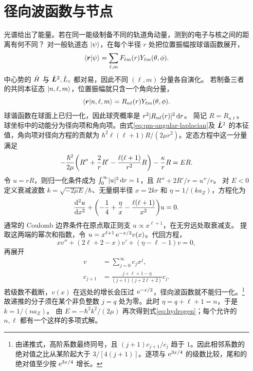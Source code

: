 \section{径向波函数与节点}
\label{sec:hydrogen-radial}
光谱给出了能量。若在同一能级制备不同的轨道角动量，测到的电子与核之间的距离有何不同？
对一般轨道态 $\ket\psi$，在每个半径 $r$ 处把位置振幅按球谐函数展开，
\begin{equation}\label{eq:qm-orbital-angular-expansion}
    \braket{\bm r}{\psi} = \sum_{\ell,m} F_{\ell m}(r)Y_{\ell m}(\theta,\phi).
\end{equation}
中心势的 $\op H$ 与 $\opbm L^2,\op L_z$ 都对易，因此不同 $(\ell,m)$ 分量各自演化。
若制备三者的共同本征态 $\ket{n,\ell,m}$，位置振幅就只含一个角向分量，
\begin{equation}\label{eq:qm-hydrogen-position-amplitude}
    \braket{\bm r}{n,\ell,m} = R_{n\ell}(r)Y_{\ell m}(\theta,\phi).
\end{equation}
球谐函数在球面上已归一化，因此球壳概率是 $r^2\abs{R_{n\ell}(r)}^2\d r$。
简记 $R = R_{n\ell}$。球坐标中的动能分为径向项和角向项。由式\eqref{eq:qm-angular-laplacian}及 $\opbm L^2$ 的本征值，角向项对径向方程的贡献为 $\hbar^2\ell(\ell + 1)R/(2\mu r^2)$。定态方程中这一分量满足
\begin{equation}
    -\frac{\hbar^2}{2\mu}
       \biggp{R'' + \frac{2}{r}R' - \frac{\ell(\ell + 1)}{r^2}R}
       - \frac{\kappa}{r}R = E R.
    \label{eq:hydrogen-radial}
\end{equation}
令 $u = rR$，则归一化条件成为 $\textstyle \intRplus\abs u^2\d r = 1$，且 $R'' + 2R'/r = u''/r$。
对 $E < 0$ 定义衰减波数 $k = \sqrt{-2\mu E}/\hbar$、无量纲半径 $x = 2kr$ 和 $\eta = 1/(ka_Z)$，方程化为
\begin{equation}
    \dv[2]{u}{x} + \biggp{-\frac14 + \frac{\eta}{x} - \frac{\ell(\ell + 1)}{x^2}}u = 0 .
\end{equation}
通常的 Coulomb 边界条件在原点取正则支 $u \propto x^{\ell+1}$，在无穷远处取衰减支。
提取这两端的幂次和指数，令 $u = x^{\ell+1}\e^{-x/2}v(x)$。代回方程，
\begin{equation}
    xv'' + (2\ell + 2 - x)v' + (\eta - \ell - 1)v = 0,
\end{equation}
再展开
\begin{subequations}
    \begin{align}
        v &= \sum_{j=0}^\infty c_j x^j,\\
        c_{j+1} &= \frac{j + \ell + 1 - \eta}{(j + 1)(j + 2\ell + 2)}c_j.
    \end{align}
\end{subequations}
若级数不截断，$v(x)$ 在远处的增长会压过 $\e^{-x/2}$，径向波函数就不能归一化。\footnote{由递推式，高阶系数最终同号，且 $(j + 1)c_{j+1}/c_j$ 趋于 $1$。因此相邻系数的绝对值之比从某阶起大于 $3/[4(j + 1)]$。逐项与 $\e^{3x/4}$ 的级数比较，尾和的绝对值至少按 $\e^{3x/4}$ 增长。}
故递推的分子须在某个非负整数 $j = q$ 处为零。此时 $\eta = q + \ell + 1 = n$，于是 $k = 1/(na_Z)$。
由 $E = -\hbar^2 k^2/(2\mu)$ 再次得到式\eqref{eq:hydrogen}；每个允许的 $n,\ell$ 都有一个这样的多项式解。

